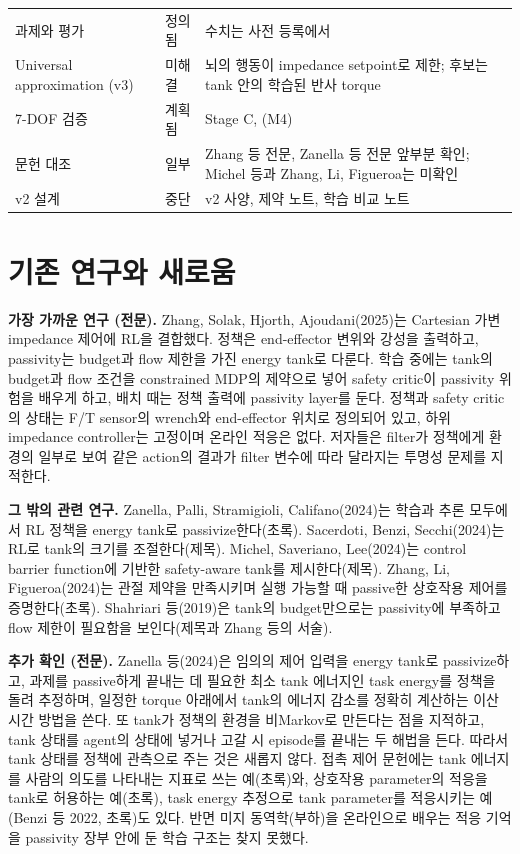 \documentclass[11pt]{article}\usepackage[margin=1in]{geometry}\usepackage{amsmath,amssymb,amsthm,mathtools}\usepackage{graphicx}\graphicspath{{figures/}{../figures/}{figs/}{./}}\usepackage{enumitem}\usepackage{hyperref}\usepackage{cleveref}\usepackage{tikz}\usetikzlibrary{arrows.meta,positioning,calc,shapes.geometric}\usepackage{float}\usepackage{rotating}\usepackage[most]{tcolorbox}\usepackage{kotex}\usepackage{booktabs}\usepackage{longtable}\emergencystretch=1.6em\tolerance=2000 \crefname{assumption}{Assumption}{Assumptions}\Crefname{assumption}{Assumption}{Assumptions}\crefname{definition}{Definition}{Definitions}\Crefname{definition}{Definition}{Definitions}\crefname{proposition}{Proposition}{Propositions}\Crefname{proposition}{Proposition}{Propositions}\crefname{fact}{Fact}{Facts}\Crefname{fact}{Fact}{Facts} \newtheorem{assumption}{Assumption}\newtheorem{definition}{Definition}\newtheorem{lemma}{Lemma}\newtheorem{proposition}{Proposition}\newtheorem{theorem}{Theorem}\newtheorem{corollary}{Corollary}\newtheorem{fact}{Fact}\theoremstyle{remark}\newtheorem{remark}{Remark} \newcommand{\R}{\mathbb{R}}\newcommand{\xb}{\bar x}\newcommand{\Ab}{\bar A}\newcommand{\By}{\bar B_y}\newcommand{\U}{\mathcal U}\newcommand{\Z}{\mathcal Z}
\begin{document}
{\begin{longtable}{p{4.3cm}p{2.6cm}p{7.6cm}}
과제와 평가 & 정의됨 & 수치는 사전 등록에서 \\
Universal approximation (v3) & 미해결 & 뇌의 행동이 impedance setpoint로 제한; 후보는 tank 안의 학습된 반사 torque \\
7-DOF 검증 & 계획됨 & Stage C, (M4) \\
문헌 대조 & 일부 & Zhang 등 전문, Zanella 등 전문 앞부분 확인; Michel 등과 Zhang, Li, Figueroa는 미확인 \\
v2 설계 & 중단 & v2 사양, 제약 노트, 학습 비교 노트 \\
\bottomrule
\end{longtable}
}

\section{기존 연구와 새로움}
\label{sec:novelty3}

\textbf{가장 가까운 연구 (전문).} Zhang, Solak, Hjorth, Ajoudani(2025)는 Cartesian 가변 impedance 제어에 RL을 결합했다. 정책은 end-effector 변위와 강성을 출력하고, passivity는 budget과 flow 제한을 가진 energy tank로 다룬다. 학습 중에는 tank의 budget과 flow 조건을 constrained MDP의 제약으로 넣어 safety critic이 passivity 위험을 배우게 하고, 배치 때는 정책 출력에 passivity layer를 둔다. 정책과 safety critic의 상태는 F/T sensor의 wrench와 end-effector 위치로 정의되어 있고, 하위 impedance controller는 고정이며 온라인 적응은 없다. 저자들은 filter가 정책에게 환경의 일부로 보여 같은 action의 결과가 filter 변수에 따라 달라지는 투명성 문제를 지적한다.

\textbf{그 밖의 관련 연구.} Zanella, Palli, Stramigioli, Califano(2024)는 학습과 추론 모두에서 RL 정책을 energy tank로 passivize한다(초록). Sacerdoti, Benzi, Secchi(2024)는 RL로 tank의 크기를 조절한다(제목). Michel, Saveriano, Lee(2024)는 control barrier function에 기반한 safety-aware tank를 제시한다(제목). Zhang, Li, Figueroa(2024)는 관절 제약을 만족시키며 실행 가능할 때 passive한 상호작용 제어를 증명한다(초록). Shahriari 등(2019)은 tank의 budget만으로는 passivity에 부족하고 flow 제한이 필요함을 보인다(제목과 Zhang 등의 서술).

\textbf{추가 확인 (전문).} Zanella 등(2024)은 임의의 제어 입력을 energy tank로 passivize하고, 과제를 passive하게 끝내는 데 필요한 최소 tank 에너지인 task energy를 정책을 돌려 추정하며, 일정한 torque 아래에서 tank의 에너지 감소를 정확히 계산하는 이산 시간 방법을 쓴다. 또 tank가 정책의 환경을 비Markov로 만든다는 점을 지적하고, tank 상태를 agent의 상태에 넣거나 고갈 시 episode를 끝내는 두 해법을 든다. 따라서 tank 상태를 정책에 관측으로 주는 것은 새롭지 않다. 접촉 제어 문헌에는 tank 에너지를 사람의 의도를 나타내는 지표로 쓰는 예(초록)와, 상호작용 parameter의 적응을 tank로 허용하는 예(초록), task energy 추정으로 tank parameter를 적응시키는 예(Benzi 등 2022, 초록)도 있다. 반면 미지 동역학(부하)을 온라인으로 배우는 적응 기억을 passivity 장부 안에 둔 학습 구조는 찾지 못했다.
\end{document}
